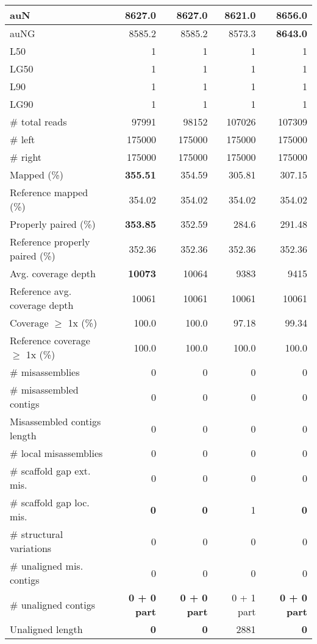 \documentclass[12pt,a4paper]{article}
\begin{document}
\begin{table}[ht]
\begin{center}
\begin{tabular}{|l*{4}{|r}|}
auN & 8627.0 & 8627.0 & 8621.0 & {\bf 8656.0} \\ \hline
auNG & 8585.2 & 8585.2 & 8573.3 & {\bf 8643.0} \\ \hline
L50 & 1 & 1 & 1 & 1 \\ \hline
LG50 & 1 & 1 & 1 & 1 \\ \hline
L90 & 1 & 1 & 1 & 1 \\ \hline
LG90 & 1 & 1 & 1 & 1 \\ \hline
\# total reads & 97991 & 98152 & 107026 & 107309 \\ \hline
\# left & 175000 & 175000 & 175000 & 175000 \\ \hline
\# right & 175000 & 175000 & 175000 & 175000 \\ \hline
Mapped (\%) & {\bf 355.51} & 354.59 & 305.81 & 307.15 \\ \hline
Reference mapped (\%) & 354.02 & 354.02 & 354.02 & 354.02 \\ \hline
Properly paired (\%) & {\bf 353.85} & 352.59 & 284.6 & 291.48 \\ \hline
Reference properly paired (\%) & 352.36 & 352.36 & 352.36 & 352.36 \\ \hline
Avg. coverage depth & {\bf 10073} & 10064 & 9383 & 9415 \\ \hline
Reference avg. coverage depth & 10061 & 10061 & 10061 & 10061 \\ \hline
Coverage $\geq$ 1x (\%) & 100.0 & 100.0 & 97.18 & 99.34 \\ \hline
Reference coverage $\geq$ 1x (\%) & 100.0 & 100.0 & 100.0 & 100.0 \\ \hline
\# misassemblies & 0 & 0 & 0 & 0 \\ \hline
\# misassembled contigs & 0 & 0 & 0 & 0 \\ \hline
Misassembled contigs length & 0 & 0 & 0 & 0 \\ \hline
\# local misassemblies & 0 & 0 & 0 & 0 \\ \hline
\# scaffold gap ext. mis. & 0 & 0 & 0 & 0 \\ \hline
\# scaffold gap loc. mis. & {\bf 0} & {\bf 0} & 1 & {\bf 0} \\ \hline
\# structural variations & 0 & 0 & 0 & 0 \\ \hline
\# unaligned mis. contigs & 0 & 0 & 0 & 0 \\ \hline
\# unaligned contigs & {\bf 0 + 0 part} & {\bf 0 + 0 part} & 0 + 1 part & {\bf 0 + 0 part} \\ \hline
Unaligned length & {\bf 0} & {\bf 0} & 2881 & {\bf 0} \\ \hline

\end{tabular}
\end{center}
\end{table}
\end{document}
